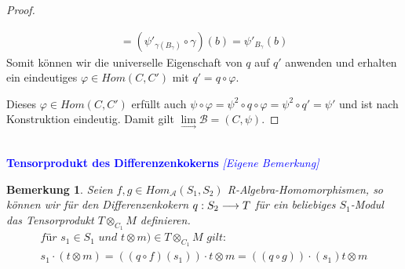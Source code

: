 \documentclass[10pt,a4paper]{report}
\newcommand{\comment}[1]{}
\newcounter{Aussage}[chapter]
\newtheorem{bem}[Aussage]{Bemerkung}
\newcommand{\functionfront}[3]{\nolinebreak{#1:#2 \longrightarrow #3}}
\newcommand{\Tensor}[3]{#1 \otimes_{#2} #3}
\newcommand{\tensor}[3]{#1 \otimes #3}
\newcommand{\colimes}[0]{\lim\limits_{ \longrightarrow }}
\begin{document}
\begin{proof}
\begin{itemize}
\begin{gather*}
= (\psi'_{\gamma(B_{\gamma})} \circ \gamma)(b)
= \psi'_{B_{\gamma}}(b)
\end{gather*}
Somit können wir die universelle Eigenschaft von $q$ auf $q'$ anwenden und erhalten ein eindeutiges $\varphi \in Hom(C,C')$ mit $q' = q \circ \varphi$.
\begin{center}
\end{center}
\end{itemize}
Dieses $\varphi \in Hom(C,C')$ erfüllt auch $\psi \circ \varphi = \psi^2 \circ q \circ \varphi = \psi^2 \circ q' = \psi'$ und ist nach Konstruktion eindeutig. Damit gilt $\colimes \mathcal{B} = (C,\psi)$.
\end{proof}


\ \\
\textcolor{blue}{\textbf{Tensorprodukt des Differenzenkokerns} \textit{[Eigene Bemerkung]}}
\begin{bem} \comment{\label{Tensorprodukt des Differenzenkokerns}}
Seien $f,g \in Hom_{\mathcal{A}}(S_1,S_2)$ R-Algebra-Homomorphismen, so können wir für den Differenzenkokern $\functionfront{q}{S_2}{T}$ für ein beliebiges $S_1$-Modul das Tensorprodukt $\Tensor{T}{C_1}{M}$ definieren. 
\begin{gather*}
\textit{für } s_1 \in S_1 \textit{ und } \tensor{t}{S_1}{m}) \in \Tensor{T}{C_1}{M} \textit{ gilt: }\\
s_1 \cdot (\tensor{t}{S_1}{m}) = \tensor{((q \circ f)(s_1)) \cdot t}{S_1}{m} = \tensor{((q \circ g)) \cdot (s_1)t}{S_1}{m}
\end{gather*}
\end{bem}
\end{document}
